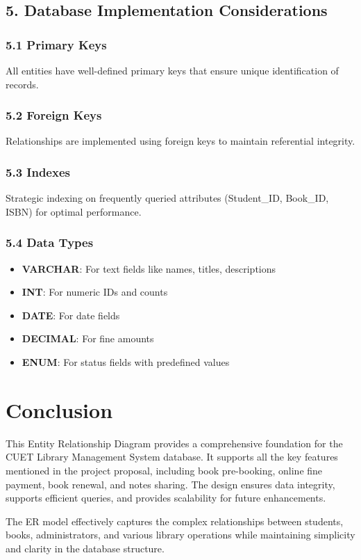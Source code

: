 \documentclass[12pt,a4paper]{article}
\begin{document}
\subsection{5. Database Implementation Considerations}

\subsubsection{5.1 Primary Keys}
All entities have well-defined primary keys that ensure unique identification of records.

\subsubsection{5.2 Foreign Keys}
Relationships are implemented using foreign keys to maintain referential integrity.

\subsubsection{5.3 Indexes}
Strategic indexing on frequently queried attributes (Student\_ID, Book\_ID, ISBN) for optimal performance.

\subsubsection{5.4 Data Types}
\begin{itemize}
    \item \textbf{VARCHAR}: For text fields like names, titles, descriptions
    \item \textbf{INT}: For numeric IDs and counts
    \item \textbf{DATE}: For date fields
    \item \textbf{DECIMAL}: For fine amounts
    \item \textbf{ENUM}: For status fields with predefined values
\end{itemize}

\section{Conclusion}

This Entity Relationship Diagram provides a comprehensive foundation for the CUET Library Management System database. It supports all the key features mentioned in the project proposal, including book pre-booking, online fine payment, book renewal, and notes sharing. The design ensures data integrity, supports efficient queries, and provides scalability for future enhancements.

The ER model effectively captures the complex relationships between students, books, administrators, and various library operations while maintaining simplicity and clarity in the database structure.
\end{document}
